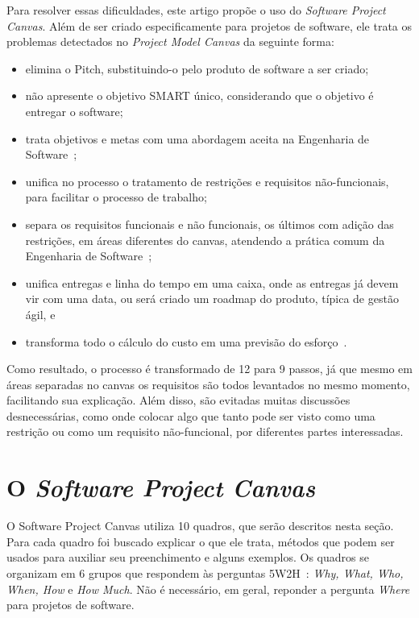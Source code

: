 \documentclass[fontsize=12pt, a4paper,pagesize=auto,toc=listof, ,twoside,chapterprefix=false,appendixprefix=true,open=right]{scrbook}
\begin{document}
Para resolver essas dificuldades, este artigo propõe o uso do \textit{Software Project Canvas}. Além de ser criado especificamente para projetos de software, ele trata os problemas detectados no \textit{Project Model Canvas} da seguinte forma:
\begin{itemize}
    \item elimina o Pitch, substituindo-o pelo produto de software a ser criado;
    \item não apresente o objetivo SMART único, considerando que o objetivo é entregar o software;
    \item trata objetivos e metas com uma abordagem aceita na Engenharia de Software~\citep{ruble_practical_1997};
    \item unifica no processo o tratamento de restrições e requisitos não-funcionais, para facilitar o processo de trabalho;
    \item separa os requisitos funcionais e não funcionais, os últimos com adição das restrições, em áreas diferentes do canvas, atendendo a prática comum da Engenharia de Software~\citep{pressman:2019};
    \item unifica entregas e linha do tempo em uma caixa, onde as entregas já devem vir com uma data, ou será criado um roadmap do produto, típica de gestão ágil, e
    \item transforma todo o cálculo do custo em uma previsão do esforço~\citep{mike:agile:estimating}.
\end{itemize}

Como resultado, o processo é transformado de 12 para 9 passos, já que mesmo em áreas separadas no canvas os requisitos são todos levantados no mesmo momento, facilitando sua explicação. Além disso, são evitadas muitas discussões desnecessárias, como onde colocar algo que tanto pode ser visto como uma restrição ou como um requisito não-funcional, por diferentes partes interessadas.

\chapter{O \textit{Software Project Canvas}}

O Software Project Canvas utiliza 10 quadros, que serão descritos nesta seção. Para cada quadro foi buscado explicar o que ele trata, métodos que podem ser usados para auxiliar seu preenchimento e alguns exemplos. Os quadros se organizam em 6 grupos que respondem às perguntas 5W2H~\citep{nakagawa:2012:5w2h}: \textit{Why, What, Who, When, How} e \textit{How Much}. Não é necessário, em geral, reponder a pergunta \textit{Where} para projetos de software.
\end{document}
